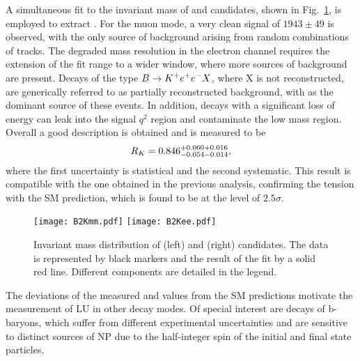 \documentclass[a4paper,11pt]{article}
\begin{document}
A simultaneous fit to the invariant mass of \BuToKpmm and \BuToKpee candidates, shown in Fig.~\ref{fig:RK_fits}, is employed to extract \RK.
For the muon mode, a very clean signal of $1943 \pm 49$ is observed, with the only source of background arising from random combinations of tracks. 
The degraded mass resolution in the electron channel requires the extension of the fit range to a wider window, where more sources of background are present. Decays of the type $B \to {\ensuremath{{{K}}^+}} e^+e^- X$, where X is not reconstructed, are generically referred to as partially reconstructed background, with \BdToKstee as the dominant source of these events. 
In addition, \BuToKJpsiee decays with a significant loss of energy can leak into the signal $q^2$ region and contaminate the low mass region.
Overall a good description is obtained and \RK is measured to be
\begin{equation}
	R_K = 0.846 ^{+0.060+0.016}_{-0.054-0.014},
\end{equation}
where the first uncertainty is statistical and the second systematic. 
This result is compatible with the one obtained in the previous analysis, confirming the tension with the SM prediction, which is found to be at the level of $2.5\sigma$.

\begin{figure}
	\centering
	\texttt{[image: B2Kmm.pdf]}
	\texttt{[image: B2Kee.pdf]}
	\caption{Invariant mass distribution of \BuToKpmm (left) and \BuToKpee (right) candidates. 
		The data is represented by black markers and the result of the fit by a solid red line. Different components are detailed in the legend.}
	\label{fig:RK_fits}
\end{figure}

The deviations of the measured \RK and \RKst values from the SM predictions motivate the measurement of LU in other decay modes. 
Of special interest are decays of b-baryons, which suffer from different experimental uncertainties and are sensitive to distinct
sources of NP due to the half-integer spin of the initial and final state particles. 
\end{document}
